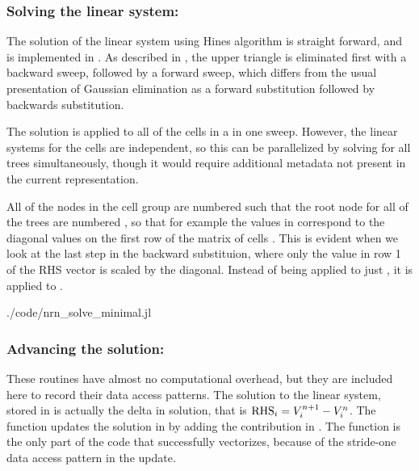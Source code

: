 \subsubsection{Solving the linear system: }
The solution of the linear system using Hines algorithm is straight forward, and is implemented in . As described in , the upper triangle is eliminated first with a backward sweep, followed by a forward sweep, which differs from the usual presentation of Gaussian elimination as a forward substitution followed by backwards substitution.

\begin{note}
The solution is applied to all of the cells in a  in one sweep.
However, the linear systems for the cells are independent, so this can be parallelized by solving for all trees simultaneously, though it would require additional metadata not present in the current  representation.

All of the nodes in the cell group are numbered such that the root node for all of the trees are numbered , so that for example the values in  correspond to the diagonal values on the first row of the matrix of cells .
This is evident when we look at the last step in the backward substituion, where only the value in row 1 of the RHS vector is scaled by the diagonal.
Instead of being applied to just , it is applied to .
\end{note}

\begin{shaded}
 {./code/nrn_solve_minimal.jl}
\end{shaded}

\subsubsection{Advancing the solution: }
These routines have almost no computational overhead, but they are included here to record their data access patterns.
The solution to the linear system, stored in  is actually the delta in solution, that is ${\text{RHS}}_{i} = {V}_{i}^{n+1} - {V}_{i}^{n}$.
The  function updates the solution in  by adding the contribution in .
The  function is the only part of the \neuron code that successfully vectorizes, because of the stride-one data access pattern in the update.

